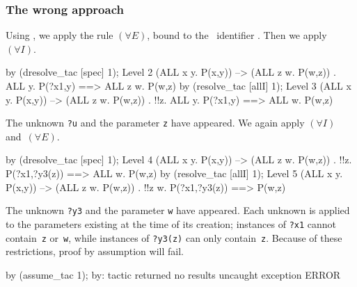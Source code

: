 \subsubsection{The wrong approach}
Using , we apply the rule $(\forall E)$, bound to the
\ML\ identifier .  Then we apply $(\forall I)$.
\begin{ttbox}
by (dresolve_tac [spec] 1);
{\out Level 2}
{\out (ALL x y. P(x,y)) --> (ALL z w. P(w,z))}
{. ALL y. P(?x1,y) ==> ALL z w. P(w,z)}
\ttbreak
by (resolve_tac [allI] 1);
{\out Level 3}
{\out (ALL x y. P(x,y)) --> (ALL z w. P(w,z))}
{. !!z. ALL y. P(?x1,y) ==> ALL w. P(w,z)}
\end{ttbox}
The unknown {\tt ?u} and the parameter {\tt z} have appeared.  We again
apply $(\forall I)$ and~$(\forall E)$.
\begin{ttbox}
by (dresolve_tac [spec] 1);
{\out Level 4}
{\out (ALL x y. P(x,y)) --> (ALL z w. P(w,z))}
{. !!z. P(?x1,?y3(z)) ==> ALL w. P(w,z)}
\ttbreak
by (resolve_tac [allI] 1);
{\out Level 5}
{\out (ALL x y. P(x,y)) --> (ALL z w. P(w,z))}
{. !!z w. P(?x1,?y3(z)) ==> P(w,z)}
\end{ttbox}
The unknown {\tt ?y3} and the parameter {\tt w} have appeared.  Each
unknown is applied to the parameters existing at the time of its creation;
instances of {\tt ?x1} cannot contain~{\tt z} or~{\tt w}, while instances
of {\tt?y3(z)} can only contain~{\tt z}.  Because of these restrictions,
proof by assumption will fail.
\begin{ttbox}
by (assume_tac 1);
{\out by: tactic returned no results}
{\out uncaught exception ERROR}
\end{ttbox}

